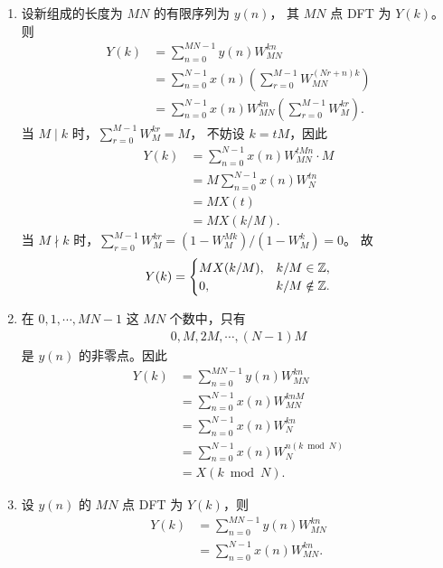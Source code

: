 \begin{solution}
    \begin{enumerate}[label=(\arabic*)]
        \item 设新组成的长度为 $MN$ 的有限序列为 $y(n)$，
            其 $MN$ 点 DFT 为 $Y(k)$。则
            \begin{align*}
                Y(k) & = \sum_{n = 0}^{MN - 1}y(n)W_{MN}^{kn} \\
                & = \sum_{n = 0}^{N - 1}x(n)\left(\sum_{r = 0}^{M - 1}W_{MN}^{(Nr + n)k}\right) \\
                & = \sum_{n = 0}^{N - 1}x(n)W_{MN}^{kn}\left(\sum_{r = 0}^{M - 1}W_M^{kr}\right).
            \end{align*}
            当 $M \mid k$ 时，$\sum_{r = 0}^{M - 1}W_M^{kr} = M$，
            不妨设 $k = tM$，因此
            \begin{align*}
                Y(k) & = \sum_{n = 0}^{N - 1}x(n)W_{MN}^{tMn} \cdot M \\
                & = M\sum_{n = 0}^{N - 1}x(n)W_N^{tn} \\
                & = MX(t) \\
                & = MX(k / M).
            \end{align*}
            当 $M \nmid k$ 时，$\sum_{r = 0}^{M - 1}W_M^{kr} = (1 - W_M^{Mk})/(1 - W_M^k) = 0$。
            故
            \begin{align*}
                Y(k) = \begin{cases}
                    MX(k / M), & k / M \in \mathbb{Z}, \\
                    0, & k / M \notin \mathbb{Z}.
                \end{cases}
            \end{align*}
        \item 在 $0, 1, \cdots, MN - 1$ 这 $MN$ 个数中，只有
            \begin{align*}
                0, M, 2M, \cdots, (N - 1)M
            \end{align*}
            是 $y(n)$ 的非零点。因此
            \begin{align*}
                Y(k) & = \sum_{n = 0}^{MN - 1}y(n)W_{MN}^{kn} \\
                & = \sum_{n = 0}^{N - 1}x(n)W_{MN}^{knM} \\
                & = \sum_{n = 0}^{N - 1}x(n)W_N^{kn} \\
                & = \sum_{n = 0}^{N - 1}x(n)W_N^{n(k \bmod N)} \\
                & = X(k \bmod N).
            \end{align*}
        \item 设 $y(n)$ 的 $MN$ 点 DFT 为 $Y(k)$，则
            \begin{align*}
                Y(k) & = \sum_{n = 0}^{MN - 1}y(n)W_{MN}^{kn} \\
                & = \sum_{n = 0}^{N - 1}x(n)W_{MN}^{kn}.
            \end{align*}


\end{enumerate}
\end{solution}
